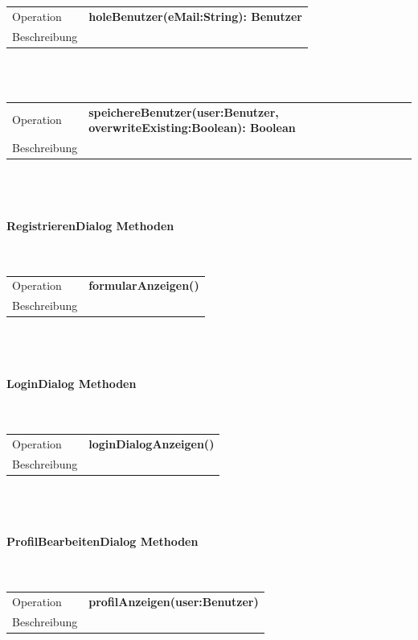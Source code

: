 \documentclass[12pt,a4paper]{article}
\begin{document}
\begin{tabular}{|lp{12cm}|}
	\hline
	Operation &  \textbf{holeBenutzer(eMail:String): Benutzer}\\ 
	Beschreibung & \\ 
	\hline 
\end{tabular} \\\\

\begin{tabular}{|lp{12cm}|}
	\hline
	Operation &  \textbf{speichereBenutzer(user:Benutzer, overwriteExisting:Boolean): Boolean}\\ 
	Beschreibung & \\ 
	\hline 
\end{tabular} \\\\


\paragraph{RegistrierenDialog  Methoden}\mbox{}\\

\begin{tabular}{|lp{12cm}|}
	\hline
	Operation &  \textbf{formularAnzeigen()}\\ 
	Beschreibung & \\ 
	\hline 
\end{tabular} \\\\

\paragraph{LoginDialog  Methoden}\mbox{}\\

\begin{tabular}{|lp{12cm}|}
	\hline
	Operation &  \textbf{loginDialogAnzeigen()}\\ 
	Beschreibung & \\ 
	\hline 
\end{tabular} \\\\


\paragraph{ProfilBearbeitenDialog  Methoden}\mbox{}\\

\begin{tabular}{|lp{12cm}|}
	\hline
	Operation &  \textbf{profilAnzeigen(user:Benutzer)}\\ 
	Beschreibung & \\ 
	\hline 
\end{tabular} \\\\
\end{document}
